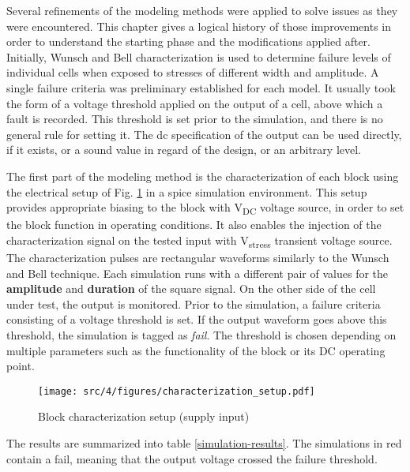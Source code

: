 Several refinements of the modeling methods were applied to solve issues as they were encountered.
This chapter gives a logical history of those improvements in order to understand the starting phase and the modifications applied after.
Initially, Wunsch and Bell characterization \cite{wunsch-bell} is used to determine failure levels of individual cells when exposed to stresses of different width and amplitude.
A single failure criteria was preliminary established for each model.
It usually took the form of a voltage threshold applied on the output of a cell, above which a fault is recorded.
This threshold is set prior to the simulation, and there is no general rule for setting it.
The \gls{dc} specification of the output can be used directly, if it exists, or a sound value in regard of the design, or an arbitrary level.

The first part of the modeling method is the characterization of each block using the electrical setup of Fig. \ref{block_function_cz} in a \gls{spice} simulation environment.
This setup provides appropriate biasing to the block with V\textsubscript{DC} voltage source, in order to set the block function in operating conditions.
It also enables the injection of the characterization signal on the tested input with V\textsubscript{stress} transient voltage source.
The characterization pulses are rectangular waveforms similarly to the Wunsch and Bell technique.
Each simulation runs with a different pair of values for the \textbf{amplitude} and \textbf{duration} of the square signal.
On the other side of the cell under test, the output is monitored.
Prior to the simulation, a failure criteria consisting of a voltage threshold is set.
If the output waveform goes above this threshold, the simulation is tagged as \textit{fail}.
The threshold is chosen depending on multiple parameters such as the functionality of the block or its DC operating point.

\begin{figure}[!h]
  \centering
  \texttt{[image: src/4/figures/characterization\_setup.pdf]}
  \caption{Block characterization setup (supply input)}
  \label{block_function_cz}
\end{figure}

The results are summarized into table \ref{simulation-results}.
The simulations in red contain a fail, meaning that the output voltage crossed the failure threshold.

